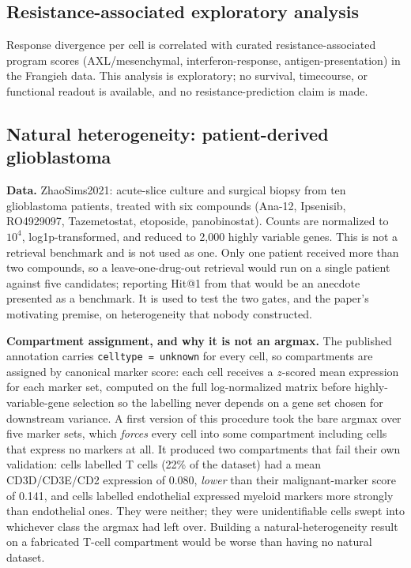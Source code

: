 \documentclass[11pt,letterpaper]{article}
\begin{document}
\subsection*{Resistance-associated exploratory analysis}

Response divergence per cell is correlated with curated resistance-associated program scores
(AXL/mesenchymal, interferon-response, antigen-presentation) in the Frangieh data. This
analysis is exploratory; no survival, timecourse, or functional readout is available, and no
resistance-prediction claim is made.

\subsection*{Natural heterogeneity: patient-derived glioblastoma}

\textbf{Data.} ZhaoSims2021: acute-slice culture and surgical biopsy from ten glioblastoma
patients, treated with six compounds (Ana-12, Ipsenisib, RO4929097, Tazemetostat, etoposide,
panobinostat). Counts are normalized to $10^4$, log1p-transformed, and reduced to 2{,}000 highly
variable genes. This is not a retrieval benchmark and is not used as one. Only one patient
received more than two compounds, so a leave-one-drug-out retrieval would run on a single patient
against five candidates; reporting Hit@1 from that would be an anecdote presented as a benchmark.
It is used to test the two gates, and the paper's motivating premise, on heterogeneity that nobody
constructed.

\textbf{Compartment assignment, and why it is not an argmax.} The published annotation carries
\texttt{celltype = unknown} for every cell, so compartments are assigned by canonical marker score:
each cell receives a $z$-scored mean expression for each marker set, computed on the full
log-normalized matrix before highly-variable-gene selection so the labelling never depends on a
gene set chosen for downstream variance. A first version of this procedure took the bare argmax
over five marker sets, which \emph{forces} every cell into some compartment including cells that
express no markers at all. It produced two compartments that fail their own validation: cells
labelled T cells (22\% of the dataset) had a mean CD3D/CD3E/CD2 expression of 0.080, \emph{lower}
than their malignant-marker score of 0.141, and cells labelled endothelial expressed myeloid
markers more strongly than endothelial ones. They were neither; they were unidentifiable cells
swept into whichever class the argmax had left over. Building a natural-heterogeneity result on a
fabricated T-cell compartment would be worse than having no natural dataset.
\end{document}
